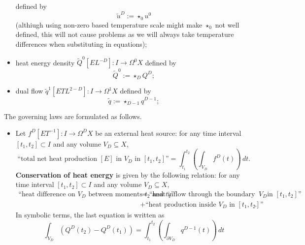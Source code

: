 \begin{discussion}
\begin{itemize}
      defined by
      \begin{equation}
        \tilde{u}^D := \star_0 u^0
      \end{equation}
      (althiugh using non-zero based temperature scale might make $\star_0$ not
      well defined, this will not cause problems as we will always take
      temperature differences when substituting in equations);
    \item
      heat energy density $\tilde{Q}^0 [E L^{-D}] \colon I \to \Omega^0 X$
      defined by
      \begin{equation}
        \tilde{Q}^0 := \star_D Q^D;
      \end{equation}
    \item
      dual flow
      $\tilde{q}^1 [E T L^{2 - D}] \colon I \to \Omega^1 X$
      defined by
      \begin{equation}
        \tilde{q} := \star_{D - 1} q^{D - 1};
      \end{equation}
  \end{itemize}
  The governing laws are formulated as follows.
  \begin{itemize}
    \item
      Let $f^D [E T^{-1}] \colon I \to \Omega^D X$ be an external heat source:
      for any time interval $[t_1, t_2] \subset I$
      and any volume $V_D \subseteq X$,
      \begin{equation}
        \text{``total net heat production $[E]$ in $V_D$ in $[t_1, t_2]$''}
        = \int_{t_1}^{t_2} \left(\int_{V_D} f^D(t) \right)\, d t.
      \end{equation}
      \textbf{Conservation of heat energy} is given by the following relation:
      for any time interval $[t_1, t_2] \subset I$
      and any volume $V_D \subseteq X$,
      \begin{equation}
        \begin{split}
        \text{``heat difference on $V_D$ between moments $t_2$ and $t_1$''}
        & =
          \text{``heat inflow through the boundary of $V_D$
          in $[t_1, t_2]$''} \\
        & +
          \text{``heat production inside $V_D$ in $[t_1, t_2]$''}.
        \end{split}
      \end{equation}
      In symbolic terms, the last equation is written as
      \begin{equation}
        \int_{V_D} (Q^D(t_2) - Q^D(t_1))
        = \int_{t_1}^{t_2}
          \left(\int_{\partial V_D} q^{D - 1}(t) \right)\, d t

\end{equation}
\end{itemize}
\end{discussion}
